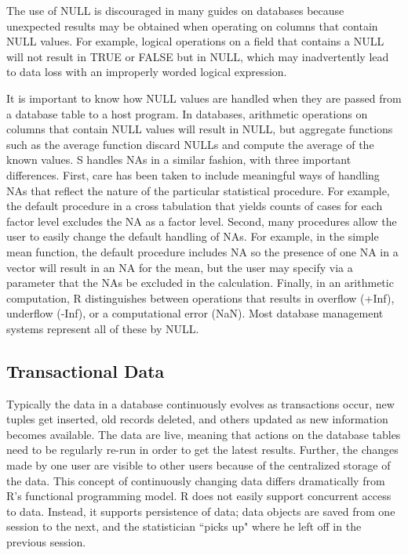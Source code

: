 The use of NULL is discouraged in many guides on databases because unexpected
results may be obtained when operating on columns that contain NULL values.
For example, logical operations on a field that contains a NULL 
will not result in TRUE or FALSE but in NULL, which may inadvertently
lead to data loss with an improperly worded logical expression.

It is important to know how NULL values are handled when they are
passed from a database table to a host program.
In databases, arithmetic operations on columns that contain NULL values will 
result in NULL, but aggregate functions such as the average function discard 
NULLs and compute the average of the known values.  
S handles NAs in a similar fashion, with three important differences.
First, care has been taken to include meaningful ways of handling NAs that 
reflect the nature of the particular statistical procedure.
For example, the default procedure in a cross tabulation that yields
counts of cases for each factor level excludes the NA as a factor level. 
Second, many procedures allow the user to easily change the default
handling of NAs. 
For example, in the simple mean function, the default procedure includes NA
so the presence of one NA in a vector will result in an NA for the mean,
but the user may specify via a parameter that the NAs be excluded in 
the calculation. 
Finally, in an arithmetic computation, R distinguishes between 
operations that results in overflow (+Inf), underflow (-Inf), or
a computational error (NaN).  Most database management systems
represent all of these by NULL.


\subsection{Transactional Data}
Typically the data in a database continuously evolves as
transactions occur, new tuples get inserted, old records
deleted, and others updated as new information becomes available.
The data are live, meaning that actions on the database tables
need to be regularly re-run in order to get the latest
results.  Further, the changes made by one user are visible to other
users because of the centralized storage of the data.
This  concept of continuously changing data differs dramatically
from R's functional programming model.
R does not easily support concurrent access to data.
Instead, it supports persistence of data; data objects are saved
from one session to the next, and the statistician ``picks up" where 
he left off in the previous session.


